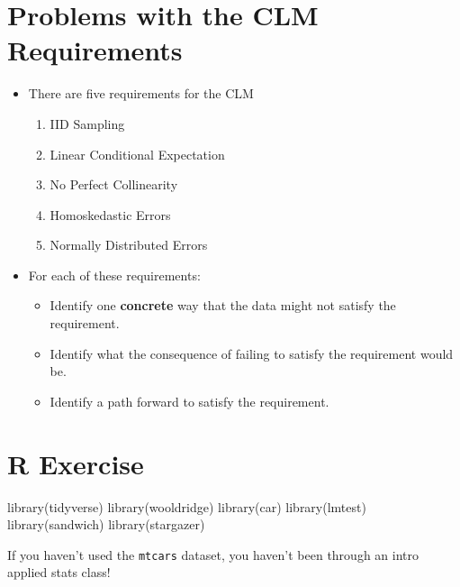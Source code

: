 \documentclass[
]{book}
\newenvironment{Shaded}{\begin{snugshade}}{\end{snugshade}}
\newcommand{\FunctionTok}[1]{\textcolor[rgb]{0.00,0.00,0.00}{#1}}
\newcommand{\NormalTok}[1]{#1}
\providecommand{\tightlist}{%
  \setlength{\itemsep}{0pt}\setlength{\parskip}{0pt}}
\theoremstyle{definition}
\theoremstyle{definition}
\theoremstyle{definition}
\theoremstyle{definition}
\theoremstyle{remark}
\begin{document}
\hypertarget{problems-with-the-clm-requirements}{%
\section{Problems with the CLM Requirements}\label{problems-with-the-clm-requirements}}

\begin{itemize}
\item
  There are five requirements for the CLM

  \begin{enumerate}
  \def\labelenumi{\arabic{enumi}.}
  \tightlist
  \item
    IID Sampling
  \item
    Linear Conditional Expectation
  \item
    No Perfect Collinearity
  \item
    Homoskedastic Errors
  \item
    Normally Distributed Errors
  \end{enumerate}
\item
  For each of these requirements:

  \begin{itemize}
  \tightlist
  \item
    Identify one \textbf{concrete} way that the data might not satisfy the requirement.
  \item
    Identify what the consequence of failing to satisfy the requirement would be.
  \item
    Identify a path forward to satisfy the requirement.
  \end{itemize}
\end{itemize}

\hypertarget{r-exercise-3}{%
\section{R Exercise}\label{r-exercise-3}}

\begin{Shaded}
\begin{Highlighting}[]
\FunctionTok{library}\NormalTok{(tidyverse)}
\FunctionTok{library}\NormalTok{(wooldridge)}
\FunctionTok{library}\NormalTok{(car)}
\FunctionTok{library}\NormalTok{(lmtest)}
\FunctionTok{library}\NormalTok{(sandwich)}
\FunctionTok{library}\NormalTok{(stargazer)}
\end{Highlighting}
\end{Shaded}

If you haven't used the \texttt{mtcars} dataset, you haven't been through an intro applied stats class!
\end{document}
